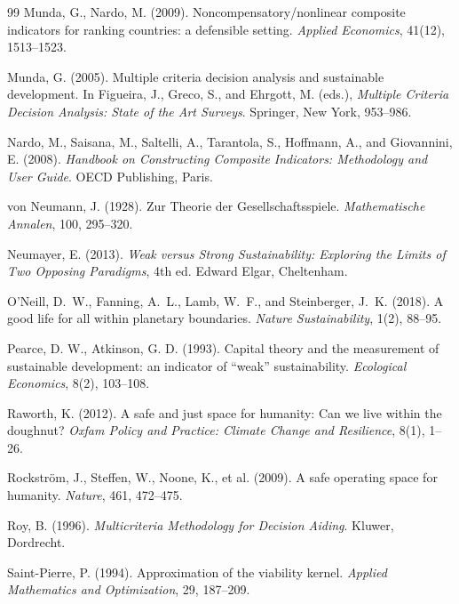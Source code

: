 \documentclass[preprint,11pt,authoryear]{elsarticle}
\theoremstyle{definition}
\theoremstyle{remark}
\begin{document}
\begin{thebibliography}{99}
 Munda, G., Nardo, M. (2009). Noncompensatory/nonlinear composite indicators for ranking countries: a defensible setting. \emph{Applied Economics}, 41(12), 1513--1523.

 Munda, G. (2005). Multiple criteria decision analysis and sustainable development. In Figueira, J., Greco, S., and Ehrgott, M. (eds.), \emph{Multiple Criteria Decision Analysis: State of the Art Surveys}. Springer, New York, 953--986.

 Nardo, M., Saisana, M., Saltelli, A., Tarantola, S., Hoffmann, A., and Giovannini, E. (2008). \emph{Handbook on Constructing Composite Indicators: Methodology and User Guide}. OECD Publishing, Paris.

 von Neumann, J. (1928). Zur Theorie der Gesellschaftsspiele. \emph{Mathematische Annalen}, 100, 295--320.

 Neumayer, E. (2013). \emph{Weak versus Strong Sustainability: Exploring the Limits of Two Opposing Paradigms}, 4th ed. Edward Elgar, Cheltenham.

 O'Neill, D.~W., Fanning, A.~L., Lamb, W.~F., and Steinberger, J.~K. (2018). A good life for all within planetary boundaries. \emph{Nature Sustainability}, 1(2), 88--95.

 Pearce, D. W., Atkinson, G. D. (1993). Capital theory and the measurement of sustainable development: an indicator of ``weak'' sustainability. \emph{Ecological Economics}, 8(2), 103--108.

 Raworth, K. (2012). A safe and just space for humanity: Can we live within the doughnut? \emph{Oxfam Policy and Practice: Climate Change and Resilience}, 8(1), 1--26.

 Rockstr\"om, J., Steffen, W., Noone, K., et al. (2009). A safe operating space for humanity. \emph{Nature}, 461, 472--475.

 Roy, B. (1996). \emph{Multicriteria Methodology for Decision Aiding}. Kluwer, Dordrecht.

 Saint-Pierre, P. (1994). Approximation of the viability kernel. \emph{Applied Mathematics and Optimization}, 29, 187--209.


\end{thebibliography}
\end{document}
